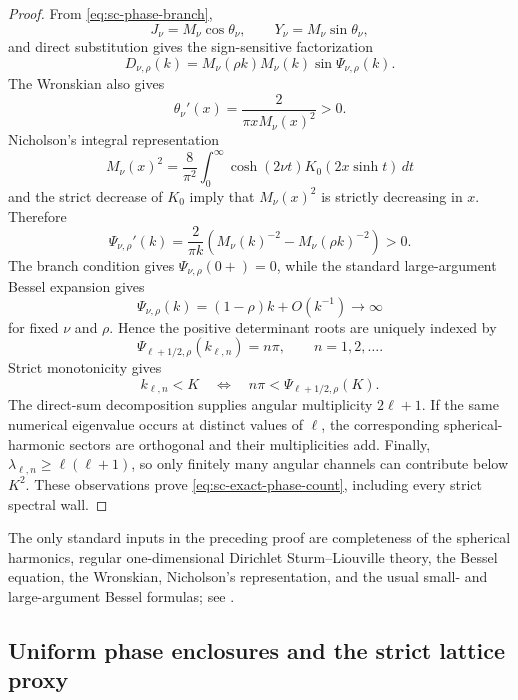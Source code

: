 \documentclass[11pt]{article}
\numberwithin{equation}{section}
\theoremstyle{definition}
\theoremstyle{remark}
\begin{document}
\begin{proof}
From \eqref{eq:sc-phase-branch},
\[
  J_\nu=M_\nu\cos\theta_\nu,
  \qquad Y_\nu=M_\nu\sin\theta_\nu,
\]
and direct substitution gives the sign-sensitive factorization
\begin{equation}
  D_{\nu,\rho}(k)
  =M_\nu(\rho k)M_\nu(k)
  \sin\Psi_{\nu,\rho}(k).
  \label{eq:sc-determinant-factorization}
\end{equation}
The Wronskian also gives
\[
  \theta_\nu'(x)=\frac2{\pi xM_\nu(x)^2}>0.
\]
Nicholson's integral representation
\[
  M_\nu(x)^2=\frac8{\pi^2}\int_0^\infty
  \cosh(2\nu t)K_0(2x\sinh t)\,dt
\]
and the strict decrease of \(K_0\) imply that \(M_\nu(x)^2\) is strictly
decreasing in \(x\).  Therefore
\begin{equation}
  \Psi_{\nu,\rho}'(k)
  =\frac2{\pi k}
  \left(M_\nu(k)^{-2}-M_\nu(\rho k)^{-2}\right)>0.
  \label{eq:sc-phase-monotonicity}
\end{equation}
The branch condition gives \(\Psi_{\nu,\rho}(0+)=0\), while the standard
large-argument Bessel expansion gives
\[
  \Psi_{\nu,\rho}(k)=(1-\rho)k+O(k^{-1})\longrightarrow\infty
\]
for fixed \(\nu\) and \(\rho\).  Hence the positive determinant roots are
uniquely indexed by
\[
  \Psi_{\ell+1/2,\rho}(k_{\ell,n})=n\pi,
  \qquad n=1,2,\ldots.
\]
Strict monotonicity gives
\[
  k_{\ell,n}<K
  \quad\Longleftrightarrow\quad
  n\pi<\Psi_{\ell+1/2,\rho}(K).
\]
The direct-sum decomposition supplies angular multiplicity \(2\ell+1\).
If the same numerical eigenvalue occurs at distinct values of \(\ell\), the
corresponding spherical-harmonic sectors are orthogonal and their
multiplicities add.  Finally,
\(\lambda_{\ell,n}\ge\ell(\ell+1)\), so only finitely many angular channels
can contribute below \(K^2\).  These observations prove
\eqref{eq:sc-exact-phase-count}, including every strict spectral wall.
\end{proof}

The only standard inputs in the preceding proof are completeness of the
spherical harmonics, regular one-dimensional Dirichlet Sturm--Liouville
theory, the Bessel equation, the Wronskian, Nicholson's representation, and
the usual small- and large-argument Bessel formulas; see \cite{DLMF}.

\subsection{Uniform phase enclosures and the strict lattice proxy}
\end{document}
